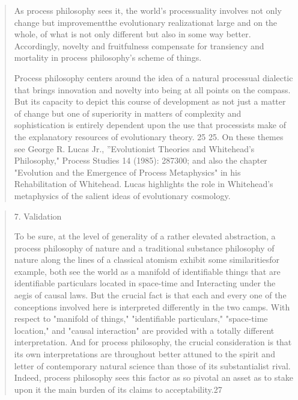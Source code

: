 \documentclass[a4paper]{Thesis}
\begin{document}
\begin{quotation}
		As process philosophy sees it, the world's processuality involves not only change but
		improvementthe evolutionary realizationat large and on the whole, of what is not only
		different but also in some way better. Accordingly, novelty and fruitfulness compensate
		for transiency and mortality in process philosophy's scheme of things.
		
		Process philosophy centers around the idea of a natural processual dialectic that brings
		innovation and novelty into being at all points on the compass. But its capacity to depict
		this course of development as not just a matter of change but one of superiority in
		matters of complexity and sophistication is entirely dependent upon the use that
		processists make of the explanatory resources of evolutionary theory.
		25
		25. On these themes see George R. Lucas Jr., ''Evolutionist Theories and Whitehead's
		Philosophy," Process Studies 14 (1985): 287300; and also the chapter "Evolution and the
		Emergence of Process Metaphysics" in his Rehabilitation of Whitehead. Lucas highlights
		the role in Whitehead's metaphysics of the salient ideas of evolutionary cosmology.
		
		
	\end{quotation}
	
	\begin{quotation}
		7. Validation
		
		To be sure, at the level of generality of a rather elevated abstraction, a process
		philosophy of nature and a traditional substance philosophy of nature along the lines of a
		classical atomism exhibit some similaritiesfor example, both see the world as a manifold
		of identifiable things that are identifiable particulars located in space-time and Interacting
		under the aegis of causal laws. But the crucial fact is that each and every one of
		the conceptions involved here is interpreted differently in the two camps. With respect to
		"manifold of things," "identifiable particulars," "space-time location," and "causal
		interaction" are provided with a totally different interpretation. And for process
		philosophy, the crucial consideration is that its own interpretations are throughout better
		attuned to the spirit and letter of contemporary natural science than those of its
		substantialist rival. Indeed, process philosophy sees this factor as so pivotal an asset as
		to stake upon it the main burden of its claims to acceptability.27
	\end{quotation}
	
	
	
\end{document}
